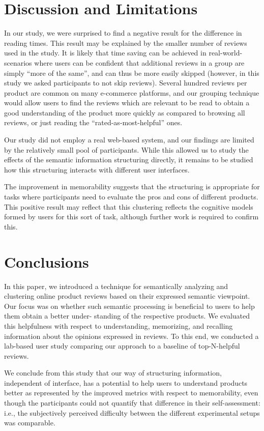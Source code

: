 \documentclass[runningheads,a4paper]{llncs}
\begin{document}
\section{Discussion and Limitations}

In our study, we were surprised to find a negative result for the difference in reading times. This result may be explained by the smaller number of reviews used in the study. It is likely that time saving can be achieved in real-world-scenarios where users can be confident that additional reviews in a group are simply ``more of the same'', and can thus be more easily skipped (however, in this study we asked participants to not skip reviews). Several hundred reviews per product are common on many e-commerce platforms, and our grouping technique would allow users to find the reviews which are relevant to be read to obtain a good understanding of the product more quickly as compared to browsing all reviews, or just reading the ``rated-as-most-helpful'' ones.

Our study did not employ a real web-based system, and our findings are limited by the relatively small pool of participants. While this allowed us to study the effects of the semantic information structuring directly, it remains to be studied how this structuring interacts with different user interfaces.

The improvement in memorability suggests that the structuring is appropriate for tasks where participants need to evaluate the pros and cons of different products. This positive result may reflect that this clustering reflects the cognitive models formed by users for this sort of task, although further work is required to confirm this.

\section{Conclusions}

In this paper, we introduced a technique for semantically analyzing and clustering online product reviews based on their expressed semantic viewpoint. Our focus was on whether such semantic processing is beneficial to users to help them obtain a better under- standing of the respective products. We evaluated this helpfulness with respect to understanding, memorizing, and recalling information about the opinions expressed in reviews. To this end, we conducted a lab-based user study comparing our approach to a baseline of top-N-helpful reviews.

We conclude from this study that our way of structuring information, independent of interface, has a potential to help users to understand products better as represented by the improved metrics with respect to memorability, even though the participants could not quantify that difference in their self-assessment: i.e., the subjectively perceived difficulty between the different experimental setups was comparable.
\end{document}
